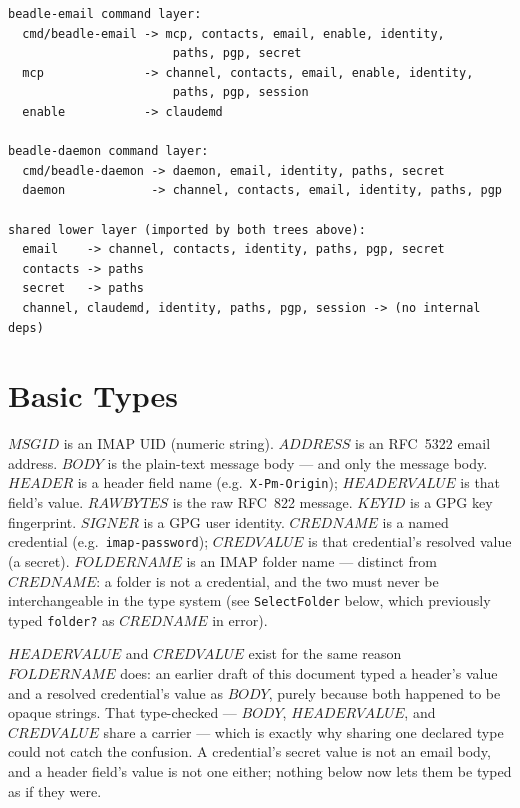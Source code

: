 \documentclass[a4paper,10pt,fleqn]{article}
\begin{document}
\begin{verbatim}
beadle-email command layer:
  cmd/beadle-email -> mcp, contacts, email, enable, identity,
                       paths, pgp, secret
  mcp              -> channel, contacts, email, enable, identity,
                       paths, pgp, session
  enable           -> claudemd

beadle-daemon command layer:
  cmd/beadle-daemon -> daemon, email, identity, paths, secret
  daemon            -> channel, contacts, email, identity, paths, pgp

shared lower layer (imported by both trees above):
  email    -> channel, contacts, identity, paths, pgp, secret
  contacts -> paths
  secret   -> paths
  channel, claudemd, identity, paths, pgp, session -> (no internal deps)
\end{verbatim}

\section{Basic Types}

\begin{zed}
\end{zed}

$MSGID$ is an IMAP UID (numeric string).  $ADDRESS$ is an RFC~5322
email address.  $BODY$ is the plain-text message body --- and only
the message body.  $HEADER$ is a header field name (e.g.\
\texttt{X-Pm-Origin}); $HEADERVALUE$ is that field's value.
$RAWBYTES$ is the raw RFC~822 message.  $KEYID$ is a GPG key
fingerprint.  $SIGNER$ is a GPG user identity.  $CREDNAME$ is a named
credential (e.g.\ \texttt{imap-password}); $CREDVALUE$ is that
credential's resolved value (a secret).  $FOLDERNAME$ is an IMAP
folder name --- distinct from $CREDNAME$: a folder is not a
credential, and the two must never be interchangeable in the type
system (see \texttt{SelectFolder} below, which previously typed
\texttt{folder?} as $CREDNAME$ in error).

$HEADERVALUE$ and $CREDVALUE$ exist for the same reason $FOLDERNAME$
does: an earlier draft of this document typed a header's value and a
resolved credential's value as $BODY$, purely because both happened
to be opaque strings.  That type-checked --- $BODY$, $HEADERVALUE$,
and $CREDVALUE$ share a carrier --- which is exactly why sharing one
declared type could not catch the confusion.  A credential's secret
value is not an email body, and a header field's value is not one
either; nothing below now lets them be typed as if they were.
\end{document}
